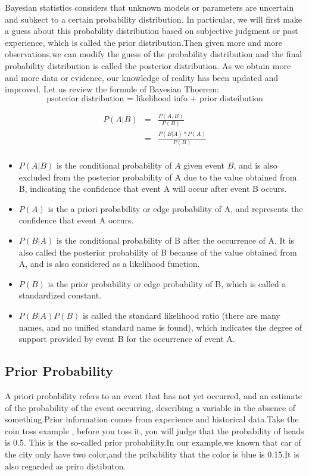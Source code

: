 Bayesian statistics considers that unknown models or parameters are uncertain and subkect to a certain probability distribution.
In particular, we will first make a guess about this probability distribution based on subjective judgment or past experience, which is called the prior distribution.Then given more and more observations,we can modify the guess of the probability distribution and the final probability distribution is called the posterior distribution. As we obtain more and more data or evidence, our knowledge of reality has been updated and improved.
Let us review the formule of Bayesian Thoerem:
$$ \text{psoterior distribution = likelihood info + prior disteibution}$$

\begin{eqnarray*}
P(A|B) &=& \frac{P(A,B)}{P(B)} \\
& = &\frac{P(B|A)*P(A)}{P(B)} \\
\end{eqnarray*}
\begin{itemize}
  \item $P(A | B)$ is the conditional probability of $A$ given event $B$, and is also excluded from the posterior probability of A due to the value obtained from B, indicating the confidence that event A will occur after event B occurs.

  \item $P(A)$ is the a priori probability or edge probability of A, and represents the confidence that event A occurs.

  \item $P(B|A)$ is the conditional probability of B after the occurrence of A. It is also called the posterior probability of B because of the value obtained from A, and is also considered as a likelihood function.

  \item $P(B)$ is the prior probability or edge probability of B, which is called a standardized constant.

  \item $P(B | A) P(B)$ is called the standard likelihood ratio (there are many names, and no unified standard name is found), which indicates the degree of support provided by event B for the occurrence of event A.
\end{itemize}
\subsection{Prior Probability}

A priori probability refers to an event that has not yet occurred, and an estimate of the probability of the event occurring, describing a variable in the absence of something.Prior information comes from experience and historical data.Take the coin toss example , before you toss it, you will judge that the probability of heads is 0.5. This is the so-called prior probability.In our example,we known that car of the city only have two color,and the pribability that the color is blue is 0.15.It is also regarded as priro distibuton.



